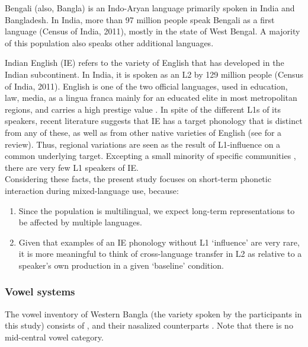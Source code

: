 \documentclass[charis,linguex]{glossa}
\newcommand{\nt}[1]{\textipa{[#1]}} %
\begin{document}
Bengali (also, Bangla) is an Indo-Aryan language primarily spoken in India and Bangladesh. In India, more than 97 million people speak Bengali as a first language (Census of India, 2011), mostly in the state of West Bengal. A majority of this population also speaks other additional languages.

Indian English (IE) refers to the variety of English that has developed in the Indian subcontinent. In India, it is spoken as an L2 by 129 million people (Census of India, 2011).  English is one of the two official languages, used in education, law, media, as a lingua franca mainly for an educated elite in most metropolitan regions, and carries a high prestige value \citep{tollefson2014language}.
In spite of the different L1s of its speakers, recent literature suggests that IE has a target phonology that is distinct from any of these, as well as from other native varieties of English (see \cite{sirsa2013effects} for a review). Thus, regional variations are seen as the result of L1-influence on a common underlying target. 
Excepting a small minority of specific communities \citep{pandey201517}, there are very few L1 speakers of IE.\\

Considering these facts, the present study focuses on short-term phonetic interaction during mixed-language use, because:
\begin{enumerate}[label=(\roman*)]
	\item Since the population is multilingual, we expect long-term representations to be affected by multiple languages. 
	\item Given that examples of an IE phonology without L1 `influence' are very rare, it is more meaningful to think of cross-language transfer in L2 as relative to a speaker's own production in a given `baseline' condition.
\end{enumerate}


\subsubsection{Vowel systems} \label{vowel systems}
The vowel inventory of Western Bangla (the variety spoken by the participants in this study) consists of \nt{i, e, \ae, a, O, o, u}, and their nasalized counterparts \citep{garry2001facts}. Note that there is no mid-central vowel category. 
\end{document}
